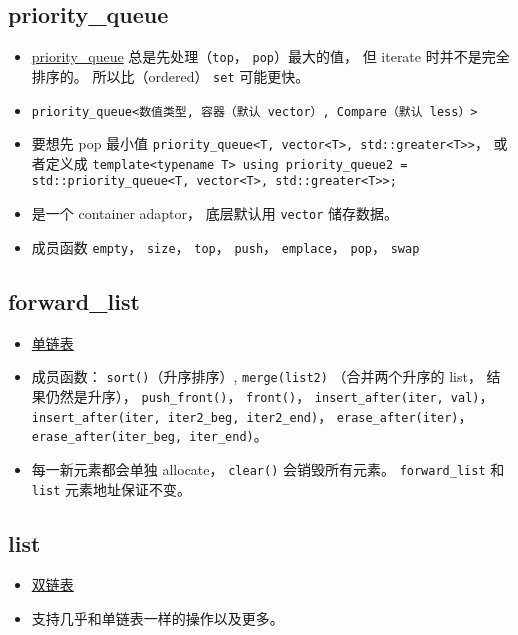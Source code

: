 \subsection{priority\_queue}
\begin{itemize}
\item \href{https://cplusplus.com/reference/queue/priority_queue/}{priority\_queue} 总是先处理（\verb|top|， \verb|pop|）最大的值， 但 iterate 时并不是完全排序的。 所以比（ordered） \verb|set| 可能更快。
\item \verb|priority_queue<数值类型, 容器（默认 vector）, Compare（默认 less）>|
\item 要想先 pop 最小值 \verb|priority_queue<T, vector<T>, std::greater<T>>|， 或者定义成 \verb|template<typename T> using priority_queue2 = std::priority_queue<T, vector<T>, std::greater<T>>;|
\item 是一个 container adaptor， 底层默认用 \verb|vector| 储存数据。
\item 成员函数 \verb|empty|， \verb|size|， \verb|top|， \verb|push|， \verb|emplace|， \verb|pop|， \verb|swap|
\end{itemize}


\subsection{forward\_list}
\begin{itemize}
\item \href{https://cplusplus.com/reference/forward_list/forward_list/}{单链表}
\item 成员函数： \verb|sort()|（升序排序）, \verb|merge(list2)| （合并两个升序的 list， 结果仍然是升序）， \verb|push_front()|， \verb|front()|， \verb|insert_after(iter, val)|，  \verb|insert_after(iter, iter2_beg, iter2_end)|， \verb|erase_after(iter)|， \verb|erase_after(iter_beg, iter_end)|。
\item 每一新元素都会单独 allocate， \verb|clear()| 会销毁所有元素。 \verb|forward_list| 和 \verb|list| 元素地址保证不变。
\end{itemize}

\subsection{list}
\begin{itemize}
\item \href{https://cplusplus.com/reference/list/list/}{双链表}
\item 支持几乎和单链表一样的操作以及更多。
\end{itemize}
